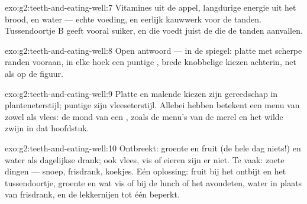 \begin{solution}{exo:g2:teeth-and-eating-well:7}
Vitamines uit de appel, langdurige energie uit het brood, en water ---
echte voeding, en eerlijk kauwwerk voor de tanden. Tussendoortje B
geeft vooral suiker, en die voedt juist de  die de tanden aanvallen.
\end{solution}

\begin{solution}{exo:g2:teeth-and-eating-well:8}
Open antwoord --- in de spiegel: platte  met scherpe randen
vooraan, in elke hoek een puntige , brede knobbelige kiezen
achterin, net als op de figuur.
\end{solution}

\begin{solution}{exo:g2:teeth-and-eating-well:9}
Platte  en malende kiezen zijn gereedschap in
planteneterstijl; puntige  zijn vleeseterstijl. Allebei
hebben betekent een menu van zowel  als vlees: de mond van een
, zoals de menu's van de merel en het wilde zwijn in dat hoofdstuk.
\end{solution}

\begin{solution}{exo:g2:teeth-and-eating-well:10}
Ontbreekt: groente en fruit (de hele dag niets!) en water als dagelijkse
drank; ook vlees, vis of eieren zijn er niet. Te vaak: zoete dingen ---
snoep, frisdrank, koekjes. Eén oplossing: fruit bij het ontbijt en het
tussendoortje, groente en wat vis of  bij de lunch of het avondeten,
water in plaats van frisdrank, en de lekkernijen tot één beperkt.
\end{solution}
